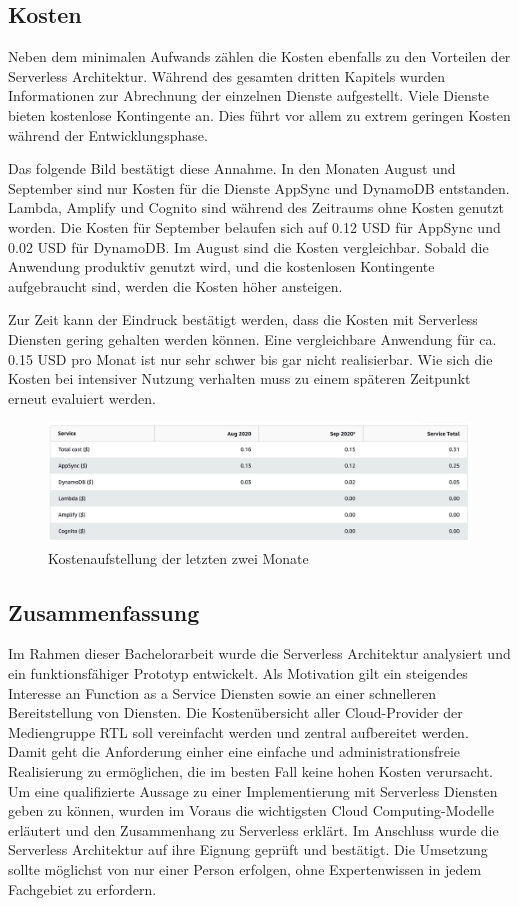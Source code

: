 \subsection{Kosten}
Neben dem minimalen Aufwands zählen die Kosten ebenfalls zu den Vorteilen der Serverless Architektur.
Während des gesamten dritten Kapitels wurden Informationen zur Abrechnung der einzelnen Dienste aufgestellt.
Viele Dienste bieten kostenlose Kontingente an.
Dies führt vor allem zu extrem geringen Kosten während der Entwicklungsphase.

Das folgende Bild bestätigt diese Annahme.
In den Monaten August und September sind nur Kosten für die Dienste AppSync und DynamoDB entstanden.
Lambda, Amplify und Cognito sind während des Zeitraums ohne Kosten genutzt worden.
Die Kosten für September belaufen sich auf 0.12 USD für AppSync und 0.02 USD für DynamoDB.
Im August sind die Kosten vergleichbar.
Sobald die Anwendung produktiv genutzt wird, und die kostenlosen Kontingente aufgebraucht sind, werden die Kosten höher ansteigen.

Zur Zeit kann der Eindruck bestätigt werden, dass die Kosten mit Serverless Diensten gering gehalten werden können.
Eine vergleichbare Anwendung für ca. 0.15 USD pro Monat ist nur sehr schwer bis gar nicht realisierbar.
Wie sich die Kosten bei intensiver Nutzung verhalten muss zu einem späteren Zeitpunkt erneut evaluiert werden.
\\
\begin{figure}[htbp]
    \centering
    \includegraphics[width=1.0\textwidth]{50-Implementierung/Kosten.png}
    \caption{Kostenaufstellung der letzten zwei Monate}
    \label{fig:meine-grafik}
\end{figure}
\clearpage

\subsection{Zusammenfassung}
Im Rahmen dieser Bachelorarbeit wurde die Serverless Architektur analysiert und ein funktionsfähiger Prototyp entwickelt.
Als Motivation gilt ein steigendes Interesse an Function as a Service Diensten sowie an einer schnelleren Bereitstellung von Diensten.
Die Kostenübersicht aller Cloud-Provider der Mediengruppe RTL soll vereinfacht werden und zentral aufbereitet werden.
Damit geht die Anforderung einher eine einfache und administrationsfreie Realisierung zu ermöglichen, die im besten Fall keine hohen Kosten verursacht.
Um eine qualifizierte Aussage zu einer Implementierung mit Serverless Diensten geben zu können, wurden im Voraus die wichtigsten Cloud Computing-Modelle erläutert und den Zusammenhang zu Serverless erklärt.
Im Anschluss wurde die Serverless Architektur auf ihre Eignung geprüft und bestätigt.
Die Umsetzung sollte möglichst von nur einer Person erfolgen, ohne Expertenwissen in jedem Fachgebiet zu erfordern.

